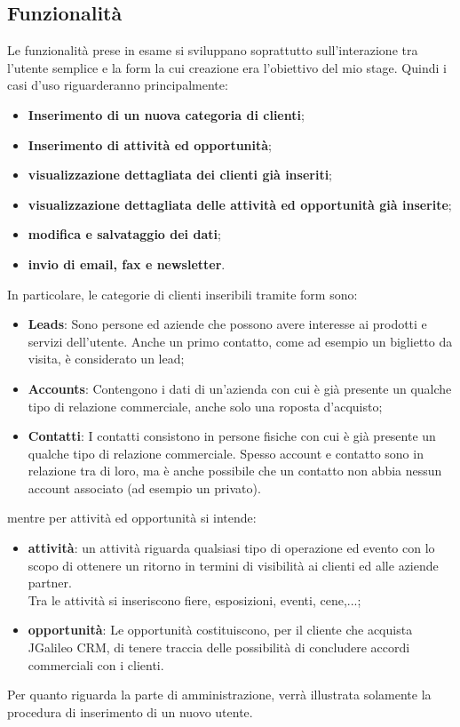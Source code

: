 \subsection{Funzionalità}
Le funzionalità prese in esame si sviluppano soprattutto sull'interazione tra l'utente semplice e la form la cui creazione era l'obiettivo del mio stage.
Quindi i casi d'uso riguarderanno principalmente:
\begin{itemize}
	\item \textbf{Inserimento di un nuova categoria di clienti};
	\item \textbf{Inserimento di attività ed opportunità};
	\item \textbf{visualizzazione dettagliata dei clienti già inseriti};
	\item \textbf{visualizzazione dettagliata delle attività ed opportunità già inserite};
	\item \textbf{modifica e salvataggio dei dati};
	\item \textbf{invio di email, fax e newsletter}.
\end{itemize}
In particolare, le categorie di clienti inseribili tramite form sono:
\begin{itemize}
	\item \textbf{Leads}: Sono persone ed aziende che possono avere interesse ai prodotti e servizi dell'utente. Anche un primo contatto, come ad esempio un biglietto da visita, è considerato un lead;
	\item \textbf{Accounts}: Contengono i dati di un'azienda con cui è già presente un qualche tipo di relazione commerciale, anche solo una roposta d'acquisto;
	\item \textbf{Contatti}: I contatti consistono in persone fisiche con cui è già presente un qualche tipo di relazione commerciale. Spesso account e contatto sono in relazione tra di loro, ma è anche possibile che un contatto non abbia nessun account associato (ad esempio un privato).
\end{itemize}
mentre per attività ed opportunità si intende:
\begin{itemize}
	\item \textbf{attività}: un attività riguarda qualsiasi tipo di operazione ed evento con lo scopo di ottenere un ritorno in termini di visibilità ai clienti ed alle aziende partner.\\
	Tra le attività si inseriscono fiere, esposizioni, eventi, cene,...;
	\item \textbf{opportunità}: Le opportunità costituiscono, per il cliente che acquista JGalileo CRM, di tenere traccia delle possibilità di concludere accordi commerciali con i clienti.
\end{itemize}
Per quanto riguarda la parte di amministrazione, verrà illustrata solamente la procedura di inserimento di un nuovo utente.

